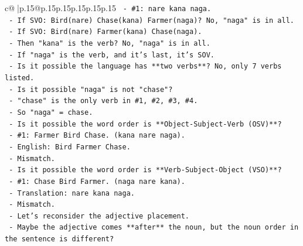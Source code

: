 \documentclass{article}
\begin{document}
{\begin{supertabular}{c@{$\;$}|p{.15\linewidth}@{}p{.15\linewidth}p{.15\linewidth}p{.15\linewidth}p{.15\linewidth}p{.15\linewidth}}
{{{\texttt{                                         {-} \#1: nare kana naga.} \\
\texttt{                                         {-} If SVO: Bird(nare) Chase(kana) Farmer(naga)? No, "naga" is in all.} \\
\texttt{                                         {-} If SVO: Bird(nare) Farmer(kana) Chase(naga).} \\
\texttt{                                           {-} Then "kana" is the verb? No, "naga" is in all.} \\
\texttt{                                           {-} If "naga" is the verb, and it's last, it's SOV.} \\
\texttt{                                       {-} Is it possible the language has **two verbs**? No, only 7 verbs listed.} \\
\texttt{                                       {-} Is it possible "naga" is not "chase"?} \\
\texttt{                                         {-} "chase" is the only verb in \#1, \#2, \#3, \#4.} \\
\texttt{                                         {-} So "naga" = chase.} \\
\texttt{                                       {-} Is it possible the word order is **Object{-}Subject{-}Verb (OSV)**?} \\
\texttt{                                         {-} \#1: Farmer Bird Chase. (kana nare naga).} \\
\texttt{                                         {-} English: Bird Farmer Chase.} \\
\texttt{                                         {-} Mismatch.} \\
\texttt{                                       {-} Is it possible the word order is **Verb{-}Subject{-}Object (VSO)**?} \\
\texttt{                                         {-} \#1: Chase Bird Farmer. (naga nare kana).} \\
\texttt{                                         {-} Translation: nare kana naga.} \\
\texttt{                                         {-} Mismatch.} \\
\texttt{                                       {-} Let's reconsider the adjective placement.} \\
\texttt{                                         {-} Maybe the adjective comes **after** the noun, but the noun order in the sentence is different?} \\
}}}
\end{supertabular}}
\end{document}
